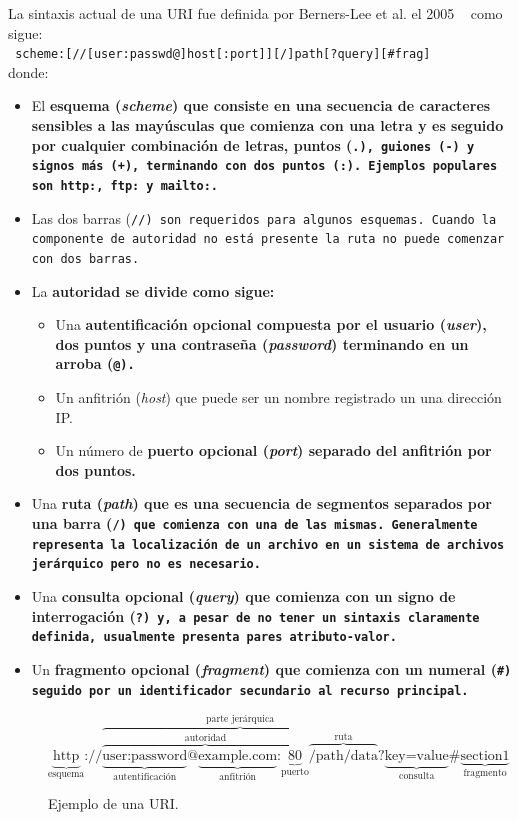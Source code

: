 La sintaxis actual de una URI fue definida por Berners-Lee et al. el
2005 ~\cite{berners2004uniform} como sigue:\\
\texttt{
  scheme:{[//{[user:passwd@]}host{[:port]}]}{[/]}path{[?query]}{[\#frag]}
}\\
donde:
\begin{itemize}
  \item
    El \bf{esquema} (\emph{scheme}) que consiste en una secuencia de caracteres
    sensibles a las mayúsculas que comienza con una letra y es seguido por
    cualquier combinación de letras, puntos (\tt{.}), guiones (\tt{-}) y signos
    más (\tt{+}), terminando con dos puntos (\tt{:}). 
    Ejemplos populares son \tt{http:}, \tt{ftp:} y \tt{mailto:}.
  \item
    Las dos barras (\tt{//}) son requeridos para algunos esquemas. Cuando la
    componente de autoridad no está presente la ruta no puede comenzar con dos
    barras.
  \item
    La \bf{autoridad} se divide como sigue:
    \begin{itemize}
      \item
        Una \bf{autentificación} opcional compuesta por el usuario
        (\emph{user}), dos puntos y una contraseña (\emph{password}) terminando
        en un arroba (\tt{@}).
      \item
        Un anfitrión (\emph{host}) que puede ser un nombre registrado un una
        dirección IP.
      \item
        Un número de \bf{puerto} opcional (\emph{port}) separado del anfitrión
        por dos puntos.
    \end{itemize}
  \item
    Una \bf{ruta} (\emph{path}) que es una secuencia de segmentos separados
    por una barra (\tt{/}) que comienza con una de las mismas. Generalmente
    representa la localización de un archivo en un sistema de archivos
    jerárquico pero no es necesario.
  \item
    Una \bf{consulta} opcional (\emph{query}) que comienza con un signo de
    interrogación (\tt{?}) y, a pesar de no tener un sintaxis claramente
    definida, usualmente presenta pares atributo-valor.
  \item
    Un \bf{fragmento} opcional (\emph{fragment}) que comienza con un numeral
    (\tt{\#}) seguido por un identificador secundario al recurso principal.
\end{itemize}

\begin{figure}[htpb]
  $$
    \underbrace{\text{http}}_{\text{esquema}}\text{://}
    \overbrace{
      \overbrace{
        \underbrace{\text{user:password}}_{\text{autentificación}}\text{@}
        \underbrace{\text{example.com}}_{\text{anfitrión}}\text{:}
        \underbrace{\text{80}}_{\text{puerto}}
      }^{\text{autoridad}}
      \overbrace{\text{/path/data}}^{\text{ruta}}
    }^{\text{parte jerárquica}}\text{?}
    \underbrace{\text{key=value}}_{\text{consulta}}\text{\#}
    \underbrace{\text{section1}}_{\text{fragmento}}
  $$
  \caption{Ejemplo de una URI.}
  \label{fig:uriex}
\end{figure}

